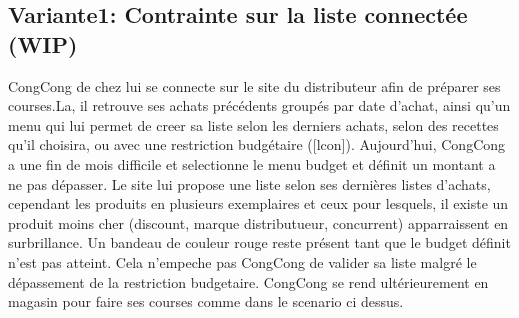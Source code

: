\subsection{Variante1: Contrainte sur la liste connectée (WIP)}
CongCong de chez lui se connecte sur le site du distributeur afin de préparer ses courses.La, il retrouve ses achats précédents groupés par date d'achat, ainsi qu'un menu qui lui permet de creer sa liste selon les derniers achats, selon des recettes qu'il choisira, ou avec une restriction budgétaire ([lcon]). 
Aujourd'hui, CongCong a une fin de mois difficile et selectionne le menu budget et définit un montant a ne pas dépasser.
Le site lui propose une liste selon ses dernières listes d'achats, cependant les produits en plusieurs exemplaires et ceux pour lesquels, il existe un produit moins cher (discount, marque distributueur, concurrent) apparraissent en surbrillance. Un bandeau de couleur rouge reste présent tant que le budget définit n'est pas atteint. Cela n'empeche pas CongCong de valider sa liste malgré le dépassement de la restriction budgetaire.
CongCong se rend ultérieurement en magasin pour faire ses courses comme dans le scenario ci dessus.
